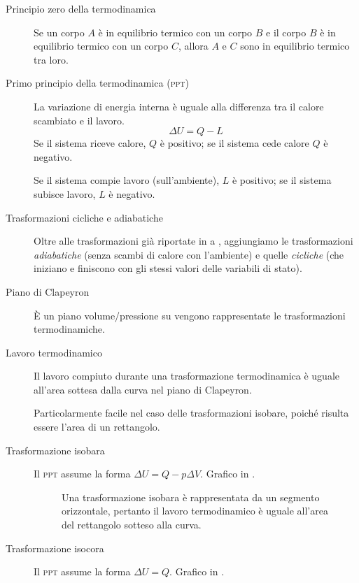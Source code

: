 \documentclass[a4paper,11pt,italian]{article}
\begin{document}
\begin{description}
  \item[Principio zero della termodinamica] 
  Se un corpo $ A $ è in equilibrio termico con un corpo $ B $ e il corpo $ B $ è in equilibrio termico con un corpo $ C $, allora $ A $ e $ C $ sono in equilibrio termico tra loro.
  
  \item[Primo principio della termodinamica (\textsc{ppt})] 
  La variazione di energia interna è uguale alla differenza tra il calore scambiato e il lavoro.
  \[ \Delta U = Q - L \]
  Se il sistema riceve calore, $ Q $ è positivo; se il sistema cede calore $ Q $ è negativo.
  
  Se il sistema compie lavoro (sull'ambiente), $ L $ è positivo; se il sistema subisce lavoro, $ L $ è negativo.
  
  \item[Trasformazioni cicliche e adiabatiche] 
  Oltre alle trasformazioni già riportate in  a , aggiungiamo le trasformazioni \emph{adiabatiche} (senza scambi di calore con l'ambiente) e quelle \emph{cicliche} (che iniziano e finiscono con gli stessi valori delle variabili di stato).
  
  \item[Piano di Clapeyron] 
  È un piano volume/pressione su vengono rappresentate le trasformazioni termodinamiche.
  
  \item[Lavoro termodinamico] 
  Il lavoro compiuto durante una trasformazione termodinamica è uguale all'area sottesa dalla curva nel piano di Clapeyron.
  
  Particolarmente facile nel caso delle trasformazioni isobare, poiché risulta essere l'area di un rettangolo.
  
  \item[Trasformazione isobara] 
  Il \textsc{ppt} assume la forma $ \Delta U = Q - p \Delta V $. Grafico in .
  
\begin{figure}[htp]\centering

\caption{Una trasformazione isobara è rappresentata da un segmento orizzontale, pertanto il lavoro termodinamico è uguale all'area del rettangolo sotteso alla curva.}
\label{img:isobara}
\end{figure}
  
  \item[Trasformazione isocora] 
  Il \textsc{ppt} assume la forma $ \Delta U = Q $. Grafico in .


\end{description}
\end{document}

